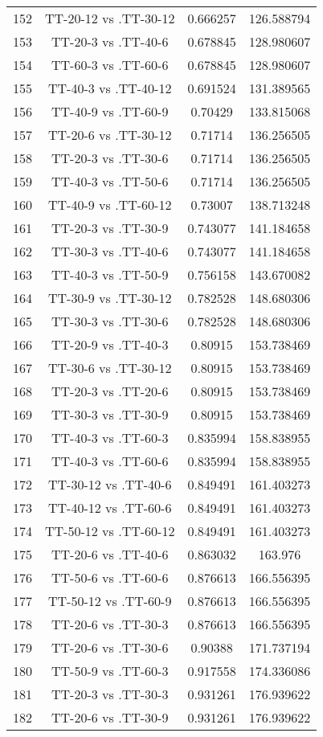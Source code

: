 \documentclass[a4paper,10pt]{article}
\begin{document}
\begin{landscape}
\begin{table}[!htp]
\begin{tabular}{cccc}
152&TT-20-12 vs .TT-30-12&0.666257&126.588794\\
153&TT-20-3 vs .TT-40-6&0.678845&128.980607\\
154&TT-60-3 vs .TT-60-6&0.678845&128.980607\\
155&TT-40-3 vs .TT-40-12&0.691524&131.389565\\
156&TT-40-9 vs .TT-60-9&0.70429&133.815068\\
157&TT-20-6 vs .TT-30-12&0.71714&136.256505\\
158&TT-20-3 vs .TT-30-6&0.71714&136.256505\\
159&TT-40-3 vs .TT-50-6&0.71714&136.256505\\
160&TT-40-9 vs .TT-60-12&0.73007&138.713248\\
161&TT-20-3 vs .TT-30-9&0.743077&141.184658\\
162&TT-30-3 vs .TT-40-6&0.743077&141.184658\\
163&TT-40-3 vs .TT-50-9&0.756158&143.670082\\
164&TT-30-9 vs .TT-30-12&0.782528&148.680306\\
165&TT-30-3 vs .TT-30-6&0.782528&148.680306\\
166&TT-20-9 vs .TT-40-3&0.80915&153.738469\\
167&TT-30-6 vs .TT-30-12&0.80915&153.738469\\
168&TT-20-3 vs .TT-20-6&0.80915&153.738469\\
169&TT-30-3 vs .TT-30-9&0.80915&153.738469\\
170&TT-40-3 vs .TT-60-3&0.835994&158.838955\\
171&TT-40-3 vs .TT-60-6&0.835994&158.838955\\
172&TT-30-12 vs .TT-40-6&0.849491&161.403273\\
173&TT-40-12 vs .TT-60-6&0.849491&161.403273\\
174&TT-50-12 vs .TT-60-12&0.849491&161.403273\\
175&TT-20-6 vs .TT-40-6&0.863032&163.976\\
176&TT-50-6 vs .TT-60-6&0.876613&166.556395\\
177&TT-50-12 vs .TT-60-9&0.876613&166.556395\\
178&TT-20-6 vs .TT-30-3&0.876613&166.556395\\
179&TT-20-6 vs .TT-30-6&0.90388&171.737194\\
180&TT-50-9 vs .TT-60-3&0.917558&174.336086\\
181&TT-20-3 vs .TT-30-3&0.931261&176.939622\\
182&TT-20-6 vs .TT-30-9&0.931261&176.939622\\

\end{tabular}
\end{table}
\end{landscape}
\end{document}
